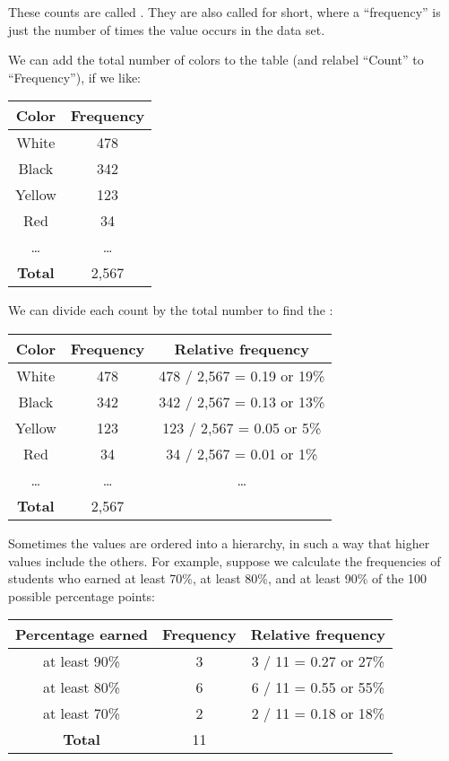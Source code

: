 \documentclass[../../../main.tex]{subfiles}
\begin{document}
These counts are called . They are also called  for short, where a ``frequency'' is just the number of times the value occurs in the data set.

We can add the total number of colors to the table (and relabel ``Count'' to ``Frequency''), if we like:

\begin{center}
  \begin{tabular}{| c | c |}
    \hline
    \textbf{Color} & \textbf{Frequency} \\
    \hline
    White & 478 \\
    \hline
    Black & 342 \\
    \hline
    Yellow & 123 \\
    \hline
    Red & 34 \\
    \hline
    \ldots & \ldots \\
    \hline
    \textbf{Total} & 2,567 \\
    \hline
  \end{tabular}
\end{center}

We can divide each count by the total number to find the :

\begin{center}
  \begin{tabular}{| c | c | c |}
    \hline
    \textbf{Color} & \textbf{Frequency} & \textbf{Relative frequency} \\
    \hline
    White & 478 & 478 / 2,567 = 0.19 or 19\% \\
    \hline
    Black & 342 & 342 / 2,567 = 0.13 or 13\% \\
    \hline
    Yellow & 123 & 123 / 2,567 = 0.05 or 5\% \\
    \hline
    Red & 34 & 34 / 2,567 = 0.01 or 1\% \\
    \hline
    \ldots & \ldots & \ldots \\
    \hline
    \textbf{Total} & 2,567 & \\
    \hline
  \end{tabular}
\end{center}

Sometimes the values are ordered into a hierarchy, in such a way that higher values include the others. For example, suppose we calculate the frequencies of students who earned at least 70\%, at least 80\%, and at least 90\% of the 100 possible percentage points:

\begin{center}
  \begin{tabular}{| c | c | c |}
    \hline
    \textbf{Percentage earned} & \textbf{Frequency} & \textbf{Relative frequency} \\
    \hline
    at least 90\% & 3 & 3 / 11 = 0.27 or 27\% \\
    \hline
    at least 80\% & 6 & 6 / 11 = 0.55 or 55\% \\
    \hline
    at least 70\% & 2 & 2 / 11 = 0.18 or 18\% \\
    \hline
    \textbf{Total} & 11& \\
    \hline
  \end{tabular}
\end{center}
\end{document}
